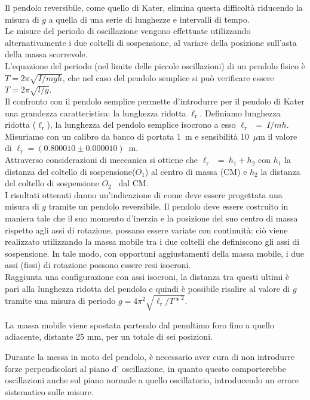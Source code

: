 \documentclass[italian, a4paper, 10pt, twocolumn]{../../style/lab_unige}
\newcommand{\Oi}{$O_1$}
\newcommand{\Oii}{$O_2$}
\newcommand{\lr}{$\ell_{\text{r}}$}
\newcommand{\LrVALUE}{$\ell_{\text{r}}=(0.800010\pm0.000010)$~m}
\begin{document}
    Il pendolo reversibile, come quello di Kater, elimina questa difficoltà riducendo la misura di $g$ a quella di una serie di lunghezze e intervalli di tempo.\\
    Le misure del periodo di oscillazione vengono effettuate utilizzando alternativamente i due coltelli di sospensione, al variare della posizione sull'asta della massa scorrevole.\\
    L’equazione del periodo (nel limite delle piccole oscillazioni) di un pendolo fisico è $T = 2\pi\sqrt{I/mgh}$, che nel caso del pendolo semplice si può verificare essere $T = 2\pi\sqrt{l/g}$.\\
    Il confronto con il pendolo semplice permette d'introdurre per il pendolo di Kater una grandezza caratteristica: la lunghezza ridotta \lr.
    Definiamo lunghezza ridotta (\lr), la lunghezza del pendolo semplice isocrono a esso \lr~$=~I/mh$. \\
    Misuriamo con un calibro da banco di portata 1~m e sensibilità 10~$\mu$m il valore di \LrVALUE.\\ 
    Attraverso considerazioni di meccanica si ottiene che \lr~$=~h_1+h_2$ con $h_1$ la distanza del coltello di sospensione(\Oi) al centro di massa (CM) e $h_2$ la distanza del coltello di sospensione \Oii~ dal CM.\\
    I risultati ottenuti danno un'indicazione di come deve essere progettata una misura di $g$ tramite un pendolo reversibile.
    Il pendolo deve essere costruito in maniera tale che il suo momento d'inerzia e la posizione del suo centro di massa rispetto agli assi di rotazione, possano essere variate con continuità: ciò viene realizzato utilizzando la massa mobile tra i due coltelli che definiscono gli assi di sospensione.
    In tale modo, con opportuni aggiustamenti della massa mobile, i due assi (fissi) di rotazione possono essere resi isocroni.\\
    Raggiunta una configurazione con assi isocroni, la distanza tra questi ultimi è pari alla lunghezza ridotta del pendolo e quindi è possibile risalire al valore di $g$ tramite una misura di periodo $g=4\pi^2\sqrt{\ell_{\text{r}}/{T*}^2}$.

    La massa mobile viene spostata partendo dal penultimo foro fino a quello adiacente, distante 25 mm, per un totale di sei posizioni.

    Durante la messa  in moto del pendolo, è necessario aver cura di non introdurre forze perpendicolari al piano d’ oscillazione, in quanto questo comporterebbe oscillazioni anche sul piano normale a quello oscillatorio, introducendo un errore sistematico sulle misure.
\end{document}
